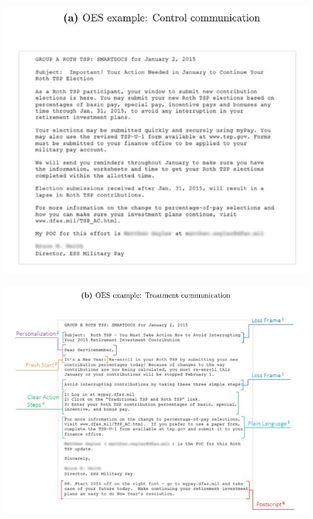 \documentclass[dvipdfmx,11pt]{beamer}
\begin{document}
\begin{frame}{}
  \begin{figure}
    \centering
    \includegraphics[scale = .55]{fig_tab/os20220412/F1a}
  \end{figure}
\end{frame}

\begin{frame}{}
  \begin{figure}
    \centering
    \includegraphics[scale = .5]{fig_tab/os20220412/F1b}
  \end{figure}
\end{frame}
\end{document}
